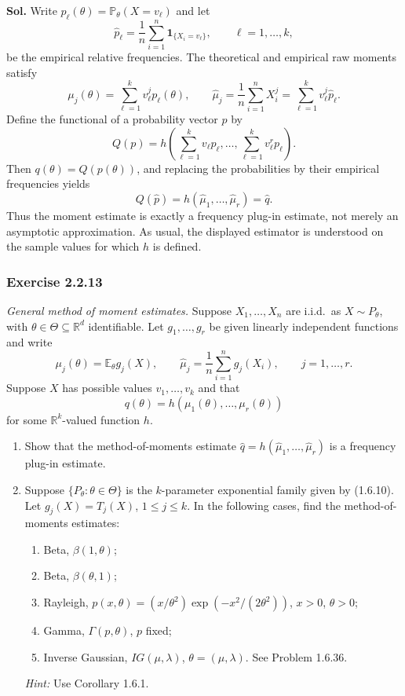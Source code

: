 \documentclass[lang=en,11pt,a4paper,citestyle=authoryear]{elegantpaper}
\newcommand{\R}{\mathbb{R}}
\newcommand{\E}{\mathbb{E}}
\renewcommand{\P}{\mathbb{P}}
\begin{document}
\par\vspace{0.5em}\noindent\textbf{Sol.}
Write $p_\ell(\theta)=\P_\theta(X=v_\ell)$ and let
\[
\widehat p_\ell=\frac1n\sum_{i=1}^n\mathbf1_{\{X_i=v_\ell\}},
\qquad \ell=1,\ldots,k,
\]
be the empirical relative frequencies. The theoretical and empirical
raw moments satisfy
\[
\mu_j(\theta)=\sum_{\ell=1}^k v_\ell^j p_\ell(\theta),
\qquad
\widehat\mu_j=\frac1n\sum_{i=1}^nX_i^j
=\sum_{\ell=1}^k v_\ell^j\widehat p_\ell.
\]
Define the functional of a probability vector $p$ by
\[
Q(p)=h\left(\sum_{\ell=1}^k v_\ell p_\ell,\ldots,
\sum_{\ell=1}^k v_\ell^r p_\ell\right).
\]
Then $q(\theta)=Q(p(\theta))$, and replacing the probabilities by their
empirical frequencies yields
\[
{Q(\widehat p)
=h(\widehat\mu_1,\ldots,\widehat\mu_r)=\widehat q.}
\]
Thus the moment estimate is exactly a frequency plug-in estimate,
not merely an asymptotic approximation. As usual, the displayed
estimator is understood on the sample values for which $h$ is defined.

\subsubsection*{Exercise 2.2.13}
\textit{General method of moment estimates.}
Suppose $X_1,\ldots,X_n$ are i.i.d.\ as $X\sim P_\theta$, with
$\theta\in\Theta\subseteq\R^d$ identifiable. Let $g_1,\ldots,g_r$ be
given linearly independent functions and write
\[
\mu_j(\theta)=\E_\theta g_j(X),\qquad
\widehat\mu_j=\frac1n\sum_{i=1}^n g_j(X_i),
\qquad j=1,\ldots,r.
\]
Suppose $X$ has possible values $v_1,\ldots,v_k$ and that
\[
q(\theta)=h(\mu_1(\theta),\ldots,\mu_r(\theta))
\]
for some $\R^k$-valued function $h$.
\begin{enumerate}[label=(\alph*),leftmargin=*]
\item Show that the method-of-moments estimate
$\widehat q=h(\widehat\mu_1,\ldots,\widehat\mu_r)$ is a frequency
plug-in estimate.
\item Suppose $\{P_\theta:\theta\in\Theta\}$ is the $k$-parameter
exponential family given by (1.6.10). Let $g_j(X)=T_j(X)$,
$1\le j\le k$. In the following cases, find the method-of-moments
estimates:
\begin{enumerate}[label=(\roman*),leftmargin=*]
\item Beta, $\beta(1,\theta)$;
\item Beta, $\beta(\theta,1)$;
\item Rayleigh,
$p(x,\theta)=(x/\theta^2)\exp(-x^2/(2\theta^2))$,
$x>0$, $\theta>0$;
\item Gamma, $\Gamma(p,\theta)$, $p$ fixed;
\item Inverse Gaussian, $IG(\mu,\lambda)$, $\theta=(\mu,\lambda)$.
See Problem 1.6.36.
\end{enumerate}
\textit{Hint:} Use Corollary 1.6.1.
\end{enumerate}
\end{document}
